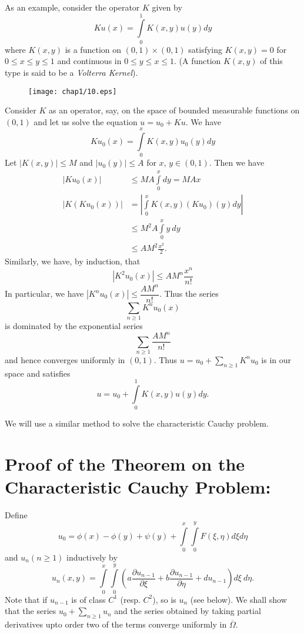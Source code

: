 As an example, consider the operator $K$ given by 
$$
Ku(x)=\int\limits^{1}_{0}K(x,y)u(y)dy
$$
where $K(x,y)$ is a function on $(0,1)\times (0,1)$ satisfying $K(x,y)=0$ for $0\leq x\leq y\leq 1$ and continuous in $0\leq y\leq x\leq 1$. (A function $K(x,y)$ of this type is said to be a {\em Volterra Kernel}).
\begin{figure}[H]
\centering
\texttt{[image: chap1/10.eps]}
\end{figure}
\noindent
Consider $K$ as an operator, say, on the space of bounded measurable functions on $(0,1)$ and let us solve the equation $u=u_{0}+Ku$. We have
$$
Ku_{0}(x)=\int\limits^{x}_{0}K(x,y)u_{0}(y)dy
$$
Let $|K(x,y)|\leq M$ and $|u_{0}(y)|\leq A$ for $x$, $y\in (0,1)$. Then we have
\begin{align*}
|Ku_{0}(x)| &\leq MA \int\limits^{x}_{0}dy=MAx\\[3pt]
|K(Ku_{0}(x))| &= |\int\limits^{x}_{0}K(x,y)(Ku_{0})(y)dy|\\[3pt]
&\leq M^{2}A\int\limits^{x}_{0}y \ dy\\[3pt]
&\leq AM^{2}\frac{x^{2}}{2}.
\end{align*}\pageoriginale
Similarly, we have, by induction, that
$$
|K^{2}u_{0}(x)|\leq AM^{n}\dfrac{x^{n}}{n!}
$$
In particular, we have $|K^{n}u_{0}(x)|\leq \dfrac{AM^{n}}{n!}$. Thus the series
$$
\sum\limits_{n\geq 1} K^{n}u_{0}(x)
$$
is dominated by the exponential series
$$
\sum\limits_{n\geq 1} \dfrac{AM^{n}}{n!}
$$
and hence converges uniformly in $(0,1)$. Thus $u=u_{0}+\sum\limits_{n\geq 1}K^{n}u_{0}$ is in our space and satisfies
$$
u=u_{0}+\int\limits^{1}_{0}K(x,y)u(y)dy.
$$

We will use a similar method to solve the characteristic Cauchy problem.

\section*{Proof of the Theorem on the Characteristic Cauchy Problem:}

Define
$$
u_{0}=\phi(x)-\phi(y)+\psi(y)+\int\limits^{x}_{0}\int\limits^{y}_{0}F(\xi,\eta)d\xi d\eta
$$
and $u_{n}(n\geq 1)$ inductively by
$$
u_{n}(x,y)=\int\limits^{x}_{0}\int\limits^{y}_{0}\left(a\frac{\partial u_{n-1}}{\partial \xi}+b\dfrac{\partial u_{n-1}}{\partial \eta}+du_{n-1}\right)d\xi \ d\eta.
$$\pageoriginale
Note that if $u_{n-1}$ is of class $C^{1}$ (resp. $C^{2}$), so is $u_{n}$ (see below). We shall show that the series $u_{0}+\sum\limits_{n\geq 1}u_{n}$ and the series obtained by taking partial derivatives upto order two of the terms converge uniformly in $\overline{\Omega}$.

